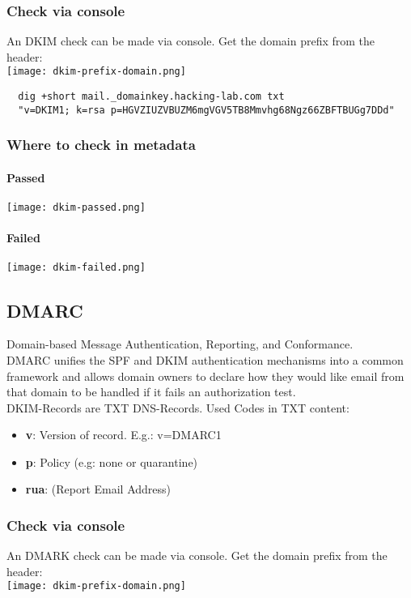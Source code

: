 \subsubsection{Check via console}
An DKIM check can be made via console.
Get the domain prefix from the header:\\
\texttt{[image: dkim-prefix-domain.png]}

\begin{lstlisting}
  dig +short mail._domainkey.hacking-lab.com txt
  "v=DKIM1; k=rsa p=HGVZIUZVBUZM6mgVGV5TB8Mmvhg68Ngz66ZBFTBUGg7DDd"
\end{lstlisting}

\subsubsection{Where to check in metadata}
\paragraph{Passed}
\texttt{[image: dkim-passed.png]}

\paragraph{Failed}
\texttt{[image: dkim-failed.png]}




\subsection{DMARC}
Domain-based Message Authentication, Reporting, and Conformance.\\

DMARC unifies the SPF and DKIM authentication mechanisms into a common framework and allows domain owners to declare how they would like email from that domain to be handled if it fails an authorization test.\\

DKIM-Records are TXT DNS-Records. Used Codes in TXT content:
\begin{itemize}
  \item \textbf{v}: Version of record. E.g.: v=DMARC1
  \item \textbf{p}: Policy (e.g: none or quarantine)
  \item \textbf{rua}: (Report Email Address)
\end{itemize}

\subsubsection{Check via console}
An DMARK check can be made via console.
Get the domain prefix from the header:\\
\texttt{[image: dkim-prefix-domain.png]}

